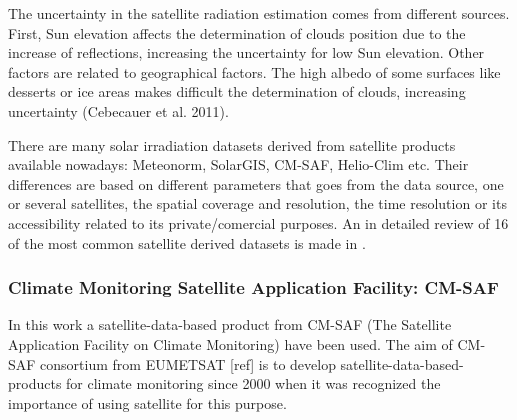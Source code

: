 The uncertainty in the satellite radiation estimation comes from different sources. First, Sun elevation affects the determination of clouds position due to the increase of reflections, increasing  the uncertainty for low Sun elevation. Other factors are related to geographical factors. The high albedo of some surfaces like desserts or ice areas makes difficult the determination of clouds, increasing uncertainty (Cebecauer et al. 2011).

There are many solar irradiation datasets derived from satellite products available nowadays: Meteonorm, SolarGIS, CM-SAF, Helio-Clim etc. Their differences are based on different parameters that goes from the data source, one or several satellites, the spatial coverage and resolution, the time resolution or its accessibility related to its private/comercial purposes. An in detailed review of 16 of the most common satellite derived datasets is made in \cite*{Vernay2014}.

 

\subsubsection{Climate Monitoring Satellite Application Facility: CM-SAF}

In this work a satellite-data-based product from CM-SAF (The Satellite Application Facility on Climate Monitoring) have been used. The aim of CM-SAF consortium from EUMETSAT [ref] is to develop satellite-data-based-products for climate monitoring since 2000 when it was recognized the importance of using satellite for this purpose.

